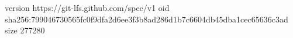 version https://git-lfs.github.com/spec/v1
oid sha256:799046730565fc0f9dfa2d6ee3f3b8ad286d1b7c6604db45dba1cec65636c3ad
size 277280
